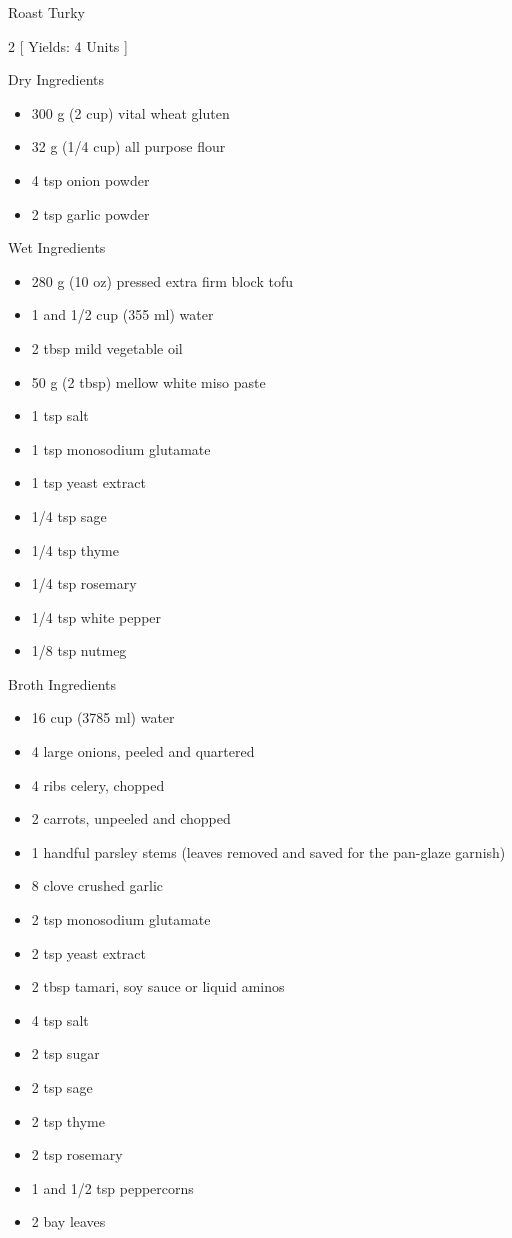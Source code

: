 \begin{Large}
    Roast Turky
\end{Large}

\begin{scriptsize}
\begin{multicols}{2}
[
\vspace{1em}
Yields: 4 Units
\vspace{-1.5em}
]

Dry Ingredients
\begin{itemize}
    \item 300 g (2 cup) vital wheat gluten
    \item 32 g (1/4 cup) all purpose flour
    \item 4 tsp onion powder
    \item 2 tsp garlic powder
\end{itemize}

Wet Ingredients
\begin{itemize}
    \item 280 g (10 oz) pressed extra firm block tofu
    \item 1 and 1/2 cup (355 ml) water
    \item 2 tbsp mild vegetable oil
    \item 50 g (2 tbsp) mellow white miso paste
    \item 1 tsp salt
    \item 1 tsp monosodium glutamate
    \item 1 tsp yeast extract
    \item 1/4 tsp sage
    \item 1/4 tsp thyme
    \item 1/4 tsp rosemary
    \item 1/4 tsp white pepper
    \item 1/8 tsp nutmeg
\end{itemize}

Broth Ingredients
\begin{itemize}
    \item 16 cup (3785 ml) water
    \item 4 large onions, peeled and quartered
    \item 4 ribs celery, chopped
    \item 2 carrots, unpeeled and chopped
    \item 1 handful parsley stems (leaves removed and saved for the pan-glaze garnish)
    \item 8 clove crushed garlic
    \item 2 tsp monosodium glutamate
    \item 2 tsp yeast extract
    \item 2 tbsp tamari, soy sauce or liquid aminos 
    \item 4 tsp salt
    \item 2 tsp sugar
    \item 2 tsp sage
    \item 2 tsp thyme
    \item 2 tsp rosemary
    \item 1 and 1/2 tsp peppercorns
    \item 2 bay leaves
\end{itemize}


\end{multicols}
\end{scriptsize}
